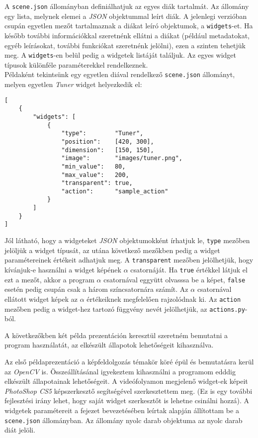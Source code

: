 A \texttt{scene.json} állományban definiálhatjuk az egyes diák tartalmát. Az állomány egy lista, melynek elemei a \textit{JSON} objektummal leírt diák. A jelenlegi verzióban csupán egyetlen mezőt tartalmaznak a diákat leíró objektumok, a \texttt{widgets}-et. Ha később további információkkal szeretnénk ellátni a diákat (például metadatokat, egyéb leírásokat, további funkciókat szeretnénk jelölni), ezen a szinten tehetjük meg. A \texttt{widgets}-en belül pedig a widgetek listáját találjuk. Az egyes widget típusok különféle paraméterekkel rendelkeznek.\\
Példaként tekintsünk egy egyetlen diával rendelkező \texttt{scene.json} állományt, melyen egyetlen \textit{Tuner} widget helyezkedik el:
\begin{verbatim}
[
    {
        "widgets": [
            {
                "type":        "Tuner",
                "position":    [420, 300],
                "dimension":   [150, 150],
                "image":       "images/tuner.png",
                "min_value":   80,
                "max_value":   200,
                "transparent": true,
                "action":      "sample_action"
            }
        ]
    }
]
\end{verbatim}
Jól látható, hogy a widgeteket \textit{JSON} objektumokként írhatjuk le, \texttt{type} mezőben jelöljük a widget típusát, az utána következő mezőkben pedig a widget paramétereinek értékeit adhatjuk meg. A \texttt{transparent} mezőben jelölhetjük, hogy kívánjuk-e használni a widget képének $\alpha$ csatornáját. Ha \texttt{true} értékkel látjuk el ezt a mezőt, akkor a program $\alpha$ csatornával eggyütt olvasssa be a képet, \texttt{false} esetén pedig csupán csak a három színcsatornára számít. Az $\alpha$ csatornával ellátott widget képek az $\alpha$ értékeiknek megfelelően rajzolódnak ki.
Az \texttt{action} mezőben pedig a widget-hez tartozó függvény nevét jelölhetjük, az \texttt{actions.py}-ból.

A következőkben két példa prezentáción keresztül szeretném bemutatni a program használatát, az elkészült állapotok lehetőségeit kihasználva.


Az első példaprezentáció a képfeldolgozás témakör köré épül és bemutatásra kerül az \textit{OpenCV} is. Összeállításánal igyekeztem kihasználni a programom edddig elkészült állapotainak lehetőségeit. A videófolyamon megjelenő widget-ek képeit \textit{PhotoShop CS5} képszerkesztő segítségével szerkesztettem meg. (Ez is egy további fejlesztési irány lehet, hogy saját widget szerkesztőt is lehetne csinálni hozzá). A widgetek paramétereit a fejezet bevezetésében leírtak alapján állítottam be a \texttt{scene.json} állományban. Az állomány nyolc darab objektuma az nyolc darab diát jelöli.


